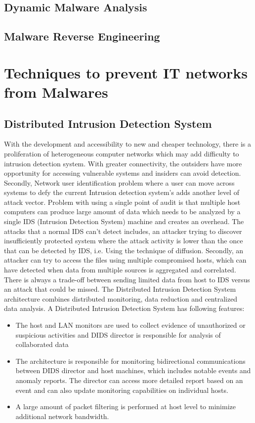 \documentclass[11pt]{article}
\begin{document}
	\subsection{Dynamic Malware Analysis}
	\subsection{Malware Reverse Engineering}
	
	\section{Techniques to prevent IT networks from Malwares}
	\subsection{Distributed Intrusion Detection System}
	With the development and accessibility to new and cheaper technology, there is a proliferation of heterogeneous computer networks which may add difficulty to intrusion detection system. With greater connectivity, the outsiders have more opportunity for accessing vulnerable systems and insiders can avoid detection. Secondly, Network user identification problem where a user can move across systems to defy the current Intrusion detection system's adds another level of attack vector. Problem with using a single point of audit is that multiple host computers can produce large amount of data which needs to be analyzed by a single IDS (Intrusion Detection System) machine and creates an overhead. The attacks that a normal IDS can’t detect includes, an attacker trying to discover insufficiently protected system where the attack activity is lower than the once that can be detected by IDS, i.e. Using the technique of diffusion. Secondly, an attacker can try to access the files using multiple compromised hosts, which can have detected when data from multiple sources is aggregated and correlated. There is always a trade-off between sending limited data from host to IDS versus an attack that could be missed.
	The Distributed Intrusion Detection System architecture combines distributed monitoring, data reduction and centralized data analysis. A Distributed Intrusion Detection System has following features:
	\begin{itemize}
		\item The host and LAN monitors are used to collect evidence of unauthorized or suspicious activities and DIDS director is responsible for analysis of collaborated data
		\item The architecture is responsible for monitoring bidirectional communications between DIDS director and host machines, which includes notable events and anomaly reports. The director can access more detailed report based on an event and can also update monitoring capabilities on individual hosts.
		\item A large amount of packet filtering is performed at host level to minimize additional network bandwidth.
	\end{itemize}
\end{document}
